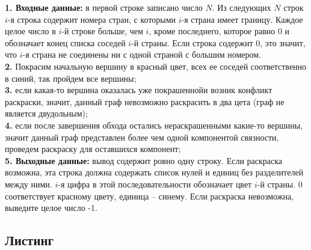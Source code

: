 \documentclass[a5paper, 10pt]{article}
\theoremstyle{definition}
\theoremstyle{plain}
\theoremstyle{remark}
\begin{document}
\textbf{1. Входные данные:} в первой строке записано число $N$. Из следующих $N$ строк $i$-я строка содержит номера стран, с которыми $i$-я страна имеет границу. Каждое целое число в $i$-й строке больше, чем $i$, кроме последнего, которое равно 0 и обозначает конец списка соседей $i$-й страны. Если строка содержит 0, это значит, что  $i$-я страна не соединены ни с одной страной с большим номером.\\

\textbf{2.}  Покрасим начальную вершину в красный цвет, всех ее соседей соответственно в синий, так пройдем все вершины;\\

\textbf{3.}  если какая-то вершина оказалась уже покрашеннойи возник конфликт раскраски, значит, данный граф невозможно раскрасить в два цета (граф не является двудольным);\\

\textbf{4.}  если после завершения обхода остались нераскрашенными какие-то вершины, значит данный граф представлен более чем одной компонентой связности, проведем раскраску для оставшихся компонент;\\

\textbf{5. Выходные данные:} вывод содержит ровно одну строку. Если раскраска возможна, эта строка должна содержать список нулей и единиц без разделителей между ними. $i$-я цифра в этой последовательности обозначает цвет $i$-й страны. 0 соответствует красному цвету, единица -- синему. Если раскраска невозможна, выведите целое число -1.

\subsection{Листинг}
\end{document}
